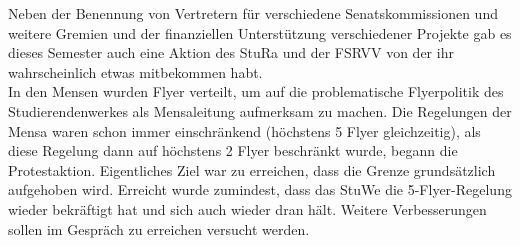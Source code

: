 Neben der Benennung von Vertretern für verschiedene Senatskommissionen und weitere Gremien und der finanziellen Unterstützung verschiedener Projekte gab es dieses Semester auch eine Aktion des StuRa und der FSRVV von der ihr wahrscheinlich etwas mitbekommen habt.\\
In den Mensen wurden Flyer verteilt, um auf die problematische Flyerpolitik des Studierendenwerkes als Mensaleitung aufmerksam zu machen. Die Regelungen der Mensa waren schon immer einschränkend (höchstens 5 Flyer gleichzeitig), als diese Regelung dann auf höchstens 2 Flyer beschränkt wurde, begann die Protestaktion. Eigentliches Ziel war zu erreichen, dass die Grenze grundsätzlich aufgehoben wird. Erreicht wurde zumindest, dass das StuWe die 5-Flyer-Regelung wieder bekräftigt hat und sich auch wieder dran hält. Weitere Verbesserungen sollen im Gespräch zu erreichen versucht werden.
